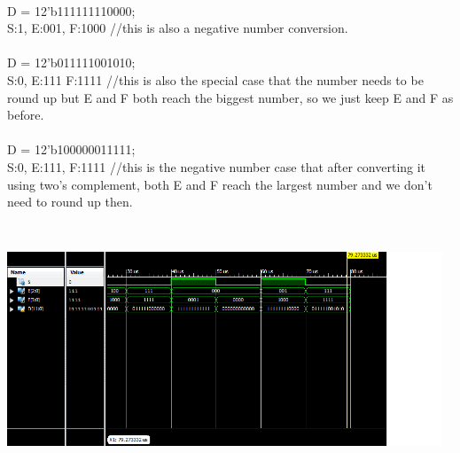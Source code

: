 \\
D = 12'b111111110000;
\\
S:1, E:001, F:1000       //this is also a negative number conversion.
\\
\\
D = 12'b011111001010;     
\\
S:0, E:111 F:1111        //this is also the special case that the number needs to be round up but E and F both reach the biggest number, so we just keep E and F as before.
\\
\\
D = 12'b100000011111;
\\
S:0, E:111, F:1111       //this is the negative number case that after converting it using two's complement, both E and F reach the largest number and we don't need to round up then. \\

\begin{minipage}{\linewidth}
            \centering
            \includegraphics[width=13cm, height=7.5cm]{lab2.png}
            \label{fig:figure2}
        \end{minipage}





